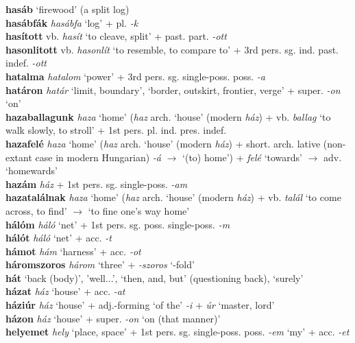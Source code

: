 \documentclass[11pt]{article}
\begin{document}
\textbf{hasáb} `firewood' (a split log) \\
\textbf{hasábfák} \emph{hasábfa} `log' + pl. \emph{-k} \\
\textbf{hasított} vb. \emph{hasít} `to cleave, split' +
past. part. \emph{-ott} \\
\textbf{hasonlitott} vb. \emph{hasonlít} `to resemble, to compare to'
+ 3rd pers. sg. ind. past. indef. \emph{-ott} \\
\textbf{hatalma} \emph{hatalom} `power' + 3rd
  pers. sg. single\hyp{}poss. poss. \emph{-a} \\
\textbf{határon} \emph{határ} `limit, boundary', `border, outskirt,
frontier, verge' + super. \emph{-on} `on' \\
\textbf{hazaballagunk} \emph{haza} `home' (\emph{haz} arch. `house' (modern
\emph{ház}) + vb. \emph{ballag} `to walk slowly, to stroll' + 1st
pers. pl. ind. pres. indef. \\
\textbf{hazafelé} \emph{haza} `home' (\emph{haz} arch. `house' (modern
\emph{ház}) + short. arch. lative (non\hyp{}extant case in modern
Hungarian) \emph{-á} $\rightarrow$ `(to) home') + \emph{felé}
`towards' $\rightarrow$ adv. `homewards' \\
\textbf{hazám} \emph{ház} + 1st
pers. sg. single\hyp{}poss. \emph{-am} \\
\textbf{hazatalálnak} \emph{haza} `home' (\emph{haz} arch. `house'
(modern \emph{ház}) + vb. \emph{talál} `to come across, to find'
$\rightarrow$ `to fine one's way home' \\
\textbf{hálóm} \emph{háló} `net' + 1st
pers. sg. poss. single\hyp{}poss. \emph{-m} \\
\textbf{hálót} \emph{háló} `net' + acc. \emph{-t} \\
\textbf{hámot} \emph{hám} `harness' + acc. \emph{-ot} \\
\textbf{háromszoros} \emph{három} `three' + \emph{-szoros} `-fold' \\
\textbf{hát} `back (body)', 'well...', `then, and, but' (questioning
back), `surely' \\
\textbf{házat} \emph{ház} `house' + acc. \emph{-at} \\
\textbf{háziúr} \emph{ház} `house' + adj.\hyp{}forming `of the' \emph{-i}
+ \emph{úr} `master, lord' \\
\textbf{házon} \emph{ház} `house' + super. \emph{-on}
`on (that manner)' \\
\textbf{helyemet} \emph{hely} `place, space' + 1st
pers. sg. single\hyp{}poss. poss. \emph{-em} `my' + acc. \emph{-et} \\
\end{document}
